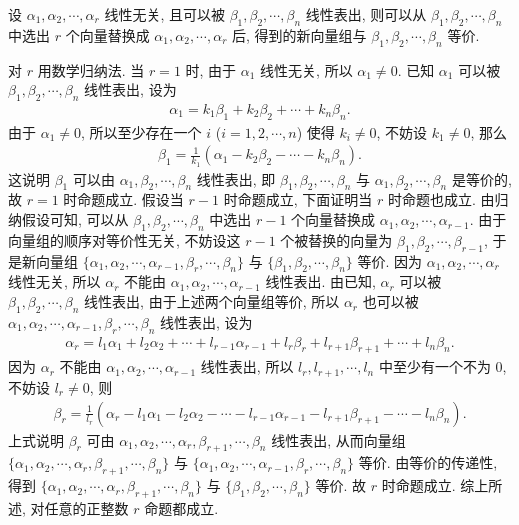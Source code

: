 \documentclass[../../main.tex]{subfiles}%
\begin{document}
\begin{theorem}[替换定理]\label{theorem:替换定理}
设 \(\alpha_1, \alpha_2, \cdots, \alpha_r\) 线性无关, 且可以被 \(\beta_1, \beta_2, \cdots, \beta_n\) 线性表出, 则可以从 \(\beta_1, \beta_2, \cdots, \beta_n\) 中选出 \(r\) 个向量替换成 \(\alpha_1, \alpha_2, \cdots, \alpha_r\) 后, 得到的新向量组与 \(\beta_1, \beta_2, \cdots, \beta_n\) 等价.
\end{theorem}
\begin{solution}
对 \(r\) 用数学归纳法.
当 \(r=1\) 时, 由于 \(\alpha_1\) 线性无关, 所以 \(\alpha_1 \neq 0\). 已知 \(\alpha_1\) 可以被 \(\beta_1, \beta_2, \cdots, \beta_n\) 线性表出, 设为
\begin{align*}
\alpha_1 = k_1\beta_1 + k_2\beta_2 + \cdots + k_n\beta_n.
\end{align*}
由于 \(\alpha_1 \neq 0\), 所以至少存在一个 \(i\) (\(i=1, 2, \cdots, n\)) 使得 \(k_i \neq 0\), 不妨设 \(k_1 \neq 0\), 那么
\begin{align*}
\beta_1 = \frac{1}{k_1}(\alpha_1 - k_2\beta_2 - \cdots - k_n\beta_n).
\end{align*}
这说明 \(\beta_1\) 可以由 \(\alpha_1, \beta_2, \cdots, \beta_n\) 线性表出, 即 \(\beta_1, \beta_2, \cdots, \beta_n\) 与 \(\alpha_1, \beta_2, \cdots, \beta_n\) 是等价的, 故 \(r=1\) 时命题成立.
假设当 \(r-1\) 时命题成立, 下面证明当 \(r\) 时命题也成立.
由归纳假设可知, 可以从 \(\beta_1, \beta_2, \cdots, \beta_n\) 中选出 \(r-1\) 个向量替换成 \(\alpha_1, \alpha_2, \cdots, \alpha_{r-1}\). 由于向量组的顺序对等价性无关, 不妨设这 \(r-1\) 个被替换的向量为 \(\beta_1, \beta_2, \cdots, \beta_{r-1}\), 于是新向量组 \(\{\alpha_1, \alpha_2, \cdots, \alpha_{r-1}, \beta_r, \cdots, \beta_n\}\) 与 \(\{\beta_1, \beta_2, \cdots, \beta_n\}\) 等价.
因为 \(\alpha_1, \alpha_2, \cdots, \alpha_r\) 线性无关, 所以 \(\alpha_r\) 不能由 \(\alpha_1, \alpha_2, \cdots, \alpha_{r-1}\) 线性表出.
由已知, \(\alpha_r\) 可以被 \(\beta_1, \beta_2, \cdots, \beta_n\) 线性表出, 由于上述两个向量组等价, 所以 \(\alpha_r\) 也可以被 \(\alpha_1, \alpha_2, \cdots, \alpha_{r-1}, \beta_r, \cdots, \beta_n\) 线性表出, 设为
\begin{align*}
\alpha_r = l_1\alpha_1 + l_2\alpha_2 + \cdots + l_{r-1}\alpha_{r-1} + l_r\beta_r + l_{r+1}\beta_{r+1} + \cdots + l_n\beta_n.
\end{align*}
因为 \(\alpha_r\) 不能由 \(\alpha_1, \alpha_2, \cdots, \alpha_{r-1}\) 线性表出, 所以 \(l_r, l_{r+1}, \cdots, l_n\) 中至少有一个不为 0, 不妨设 \(l_r \neq 0\), 则
\begin{align*}
\beta_r = \frac{1}{l_r}(\alpha_r - l_1\alpha_1 - l_2\alpha_2 - \cdots - l_{r-1}\alpha_{r-1} - l_{r+1}\beta_{r+1} - \cdots - l_n\beta_n).
\end{align*}
上式说明 \(\beta_r\) 可由 \(\alpha_1, \alpha_2, \cdots, \alpha_r, \beta_{r+1}, \cdots, \beta_n\) 线性表出, 从而向量组 \(\{\alpha_1, \alpha_2, \cdots, \alpha_r, \beta_{r+1}, \cdots, \beta_n\}\) 与 \(\{\alpha_1, \alpha_2, \cdots, \alpha_{r-1}, \beta_r, \cdots, \beta_n\}\) 等价. 由等价的传递性, 得到 \(\{\alpha_1, \alpha_2, \cdots, \alpha_r, \beta_{r+1}, \cdots, \beta_n\}\) 与 \(\{\beta_1, \beta_2, \cdots, \beta_n\}\) 等价. 故 \(r\) 时命题成立.
综上所述, 对任意的正整数 \(r\) 命题都成立.
\end{solution}
\end{document}
